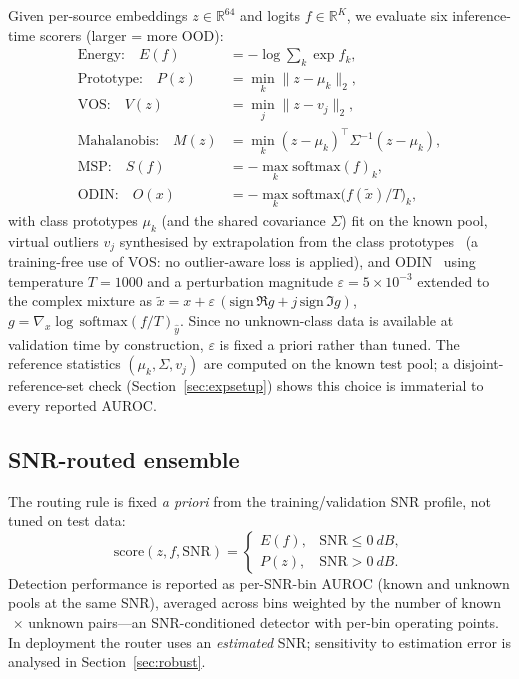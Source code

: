 \documentclass[review,12pt]{elsarticle}
\newcommand{\snr}{\mathrm{SNR}}
\begin{document}
Given per-source embeddings $z \in \mathbb{R}^{64}$ and logits
$f \in \mathbb{R}^{K}$, we evaluate six inference-time scorers (larger
= more OOD):
\begin{align}
  \text{Energy:}\quad
    E(f) &= -\log\textstyle\sum_k \exp f_k, \label{eq:energy}\\
  \text{Prototype:}\quad
    P(z) &= \min_k \| z - \mu_k \|_2, \label{eq:proto}\\
  \text{VOS:}\quad
    V(z) &= \min_j \| z - v_j \|_2, \label{eq:vos}\\
  \text{Mahalanobis:}\quad
    M(z) &= \min_k (z - \mu_k)^{\top} \Sigma^{-1} (z - \mu_k),
    \label{eq:maha}\\
  \text{MSP:}\quad
    S(f) &= -\max_k \mathrm{softmax}(f)_k, \label{eq:msp}\\
  \text{ODIN:}\quad
    O(x) &= -\max_k \mathrm{softmax}\!\big(f(\tilde{x}) / T\big)_k,
    \label{eq:odin}
\end{align}
with class prototypes $\mu_k$ (and the shared covariance $\Sigma$) fit
on the known pool, virtual outliers $v_j$ synthesised by extrapolation
from the class prototypes~\cite{du2022vos} (a training-free use of VOS:
no outlier-aware loss is applied), and ODIN~\cite{liang2018odin} using
temperature $T = 1000$ and a perturbation magnitude
$\varepsilon = 5\times10^{-3}$ extended to the complex mixture as
$\tilde{x} = x + \varepsilon\,(\mathrm{sign}\,\Re g + j\,\mathrm{sign}\,\Im g)$,
$g = \nabla_x \log\,\mathrm{softmax}(f/T)_{\hat{y}}$. Since no
unknown-class data is available at validation time by construction,
$\varepsilon$ is fixed a priori rather than tuned. The reference
statistics $(\mu_k, \Sigma, v_j)$ are computed on the known test pool;
a disjoint-reference-set check (Section~\ref{sec:expsetup}) shows this
choice is immaterial to every reported AUROC.

\subsection{SNR-routed ensemble}
\label{sec:routed}

The routing rule is fixed \emph{a priori} from the training/validation
SNR profile, not tuned on test data:
\begin{equation}
  \text{score}(z, f, \snr) =
  \begin{cases}
    E(f), & \snr \leq \SI{0}{dB},\\
    P(z), & \snr > \SI{0}{dB}.
  \end{cases}
  \label{eq:rule}
\end{equation}
Detection performance is reported as per-SNR-bin AUROC (known and
unknown pools at the same SNR), averaged across bins weighted by the
number of known$\,\times\,$unknown pairs---an SNR-conditioned detector
with per-bin operating points. In deployment the router uses an
\emph{estimated} SNR; sensitivity to estimation error is analysed in
Section~\ref{sec:robust}.
\end{document}

